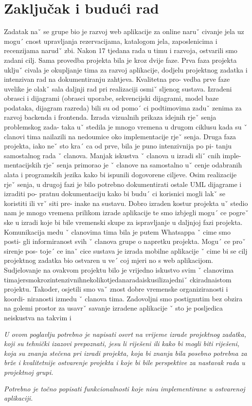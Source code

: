 \chapter{Zaključak i budući rad}
		
		Zadatak naˇ se grupe bio je razvoj web aplikacije za online naruˇ civanje jela uz
		mogu´ cnost upravljanja rezervacijama, katalogom jela, zaposlenicima i recenzijama
		narudˇ zbi. Nakon 17 tjedana rada u timu i razvoja, ostvarili smo zadani cilj. Sama
		provedba projekta bila je kroz dvije faze.
		Prva faza projekta ukljuˇ civala je okupljanje tima za razvoj aplikacije, dodjelu
		projektnog zadatka i intenzivan rad na dokumentiranju zahtjeva. Kvalitetna pro-
		vedba prve faze uvelike je olakˇ sala daljnji rad pri realizaciji osmiˇ sljenog sustava.
		Izradeni obrasci i dijagrami (obrasci uporabe, sekvencijski dijagrami, model baze
		podataka, dijagram razreda) bili su od pomo´ ci podtimovima zaduˇ zenima za razvoj
		backenda i frontenda. Izrada vizualnih prikaza idejnih rjeˇ senja problemskog zada-
		taka uˇ stedila je mnogo vremena u drugom ciklusu kada su ˇ clanovi tima nailazili
		na nedoumice oko implementacije rjeˇ senja.
		Druga faza projekta, iako neˇ sto kra´ ca od prve, bila je puno intenzivnija po pi-
		tanju samostalnog rada ˇ clanova. Manjak iskustva ˇ clanova u izradi sliˇ cnih imple-
		mentacijskih rjeˇ senja primorao je ˇ clanove na samostalno uˇ cenje odabranih alata i
		programskih jezika kako bi ispunili dogovorene ciljeve. Osim realizacije rjeˇ senja,
		u drugoj fazi je bilo potrebno dokumentirati ostale UML dijagrame i izraditi po-
		pratnu dokumentaciju kako bi budu´ ci korisnici mogli lakˇ se koristiti ili vrˇ siti pre-
		inake na sustavu. Dobro izraden kostur projekta uˇ stedio nam je mnogo vremena
		prilikom izrade aplikacije te smo izbjegli mogu´ ce pogreˇ ske u izradi koje bi bile
		vremenski skupe za ispravljanje u daljnjoj fazi projekta.
		Komunikacija medu ˇ clanovima tima bila je putem Whatsappa ˇ cime smo posti-
		gli informiranost svih ˇ clanova grupe o napretku projekta. Mogu´ ce proˇ sirenje pos-
		toje´ ce inaˇ cice sustava je izrada mobilne aplikacije ˇ cime bi se cilj projektnog zadatka
		bio ostvaren u ve´ coj mjeri no s web aplikacijom.
		Sudjelovanje na ovakvom projektu bilo je vrijedno iskustvo svim ˇ clanovima
		timajersmokrozintenzivnihnekolikotjedanaradaiskusilizajedniˇ ckiradnaistom
		projektu. Takoder, osjetili smo vaˇ znost dobre vremenske organiziranosti i koordi-
		niranosti izmedu ˇ clanova tima. Zadovoljni smo postignutim bez obzira na golemi
		prostor za usavrˇ savanje izradene aplikacije ˇ sto je posljedica neiskustva na takvim i
		
		 \textit{U ovom poglavlju potrebno je napisati osvrt na vrijeme izrade projektnog zadatka, koji su tehnički izazovi prepoznati, jesu li riješeni ili kako bi mogli biti riješeni, koja su znanja stečena pri izradi projekta, koja bi znanja bila posebno potrebna za brže i kvalitetnije ostvarenje projekta i koje bi bile perspektive za nastavak rada u projektnoj grupi.}
		
		 \textit{Potrebno je točno popisati funkcionalnosti koje nisu implementirane u ostvarenoj aplikaciji.}
		
		\eject 